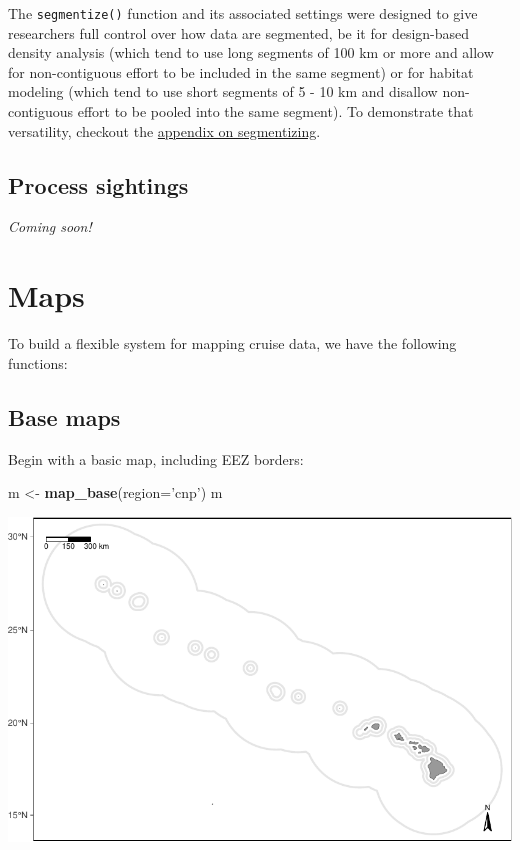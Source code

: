 \documentclass[
]{book}
\newenvironment{Shaded}{\begin{snugshade}}{\end{snugshade}}
\newcommand{\DataTypeTok}[1]{\textcolor[rgb]{0.13,0.29,0.53}{#1}}
\newcommand{\KeywordTok}[1]{\textcolor[rgb]{0.13,0.29,0.53}{\textbf{#1}}}
\newcommand{\NormalTok}[1]{#1}
\newcommand{\StringTok}[1]{\textcolor[rgb]{0.31,0.60,0.02}{#1}}
\begin{document}
The \texttt{segmentize()} function and its associated settings were designed to give researchers full control over how data are segmented, be it for design-based density analysis (which tend to use long segments of 100 km or more and allow for non-contiguous effort to be included in the same segment) or for habitat modeling (which tend to use short segments of 5 - 10 km and disallow non-contiguous effort to be pooled into the same segment). To demonstrate that versatility, checkout the \protect\hyperlink{segmentizing}{appendix on segmentizing}.

\hypertarget{process-sightings}{%
\section*{Process sightings}\label{process-sightings}}

\emph{Coming soon!}

\hypertarget{maps}{%
\chapter{Maps}\label{maps}}

To build a flexible system for mapping cruise data, we have the following functions:

\hypertarget{base-maps}{%
\section*{Base maps}\label{base-maps}}

Begin with a basic map, including EEZ borders:

\begin{Shaded}
\begin{Highlighting}[]
\NormalTok{m <-}\StringTok{ }\KeywordTok{map_base}\NormalTok{(}\DataTypeTok{region=}\StringTok{'cnp'}\NormalTok{)}
\NormalTok{m}
\end{Highlighting}
\end{Shaded}

\includegraphics{figures/unnamed-chunk-43-1.pdf}
\end{document}

